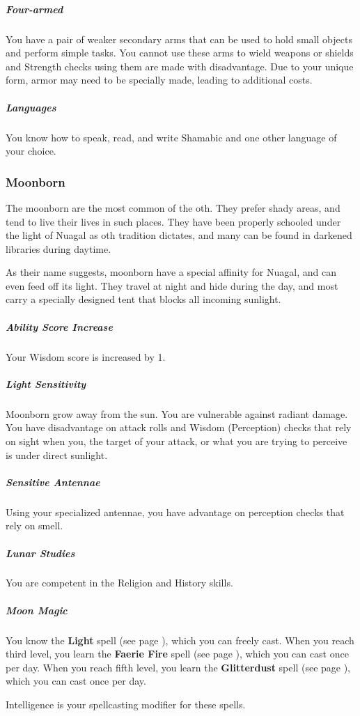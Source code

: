     \subparagraph{Four-armed} You have a pair of weaker secondary arms that can be used to hold small objects and perform simple tasks.
    You cannot use these arms to wield weapons or shields and Strength checks using them are made with disadvantage.
    Due to your unique form, armor may need to be specially made, leading to additional costs.

    \subparagraph{Languages} You know how to speak, read, and write Shamabic and one other language of your choice.

\subsubsection{Moonborn}
    The moonborn are the most common of the oth.
    They prefer shady areas, and tend to live their lives in such places.
    They have been properly schooled under the light of Nuagal as oth tradition dictates, and many can be found in darkened libraries during daytime.

    As their name suggests, moonborn have a special affinity for Nuagal, and can even feed off its light.
    They travel at night and hide during the day, and most carry a specially designed tent that blocks all incoming sunlight.

    \subparagraph{Ability Score Increase} Your Wisdom score is increased by 1.

    \subparagraph{Light Sensitivity} Moonborn grow away from the sun.
    You are vulnerable against radiant damage.
    You have disadvantage on attack rolls and Wisdom (Perception) checks that rely on sight when you, the target of your attack, or what you are trying to perceive is under direct sunlight.

    \subparagraph{Sensitive Antennae} Using your specialized antennae, you have advantage on perception checks that rely on smell.

    \subparagraph{Lunar Studies} You are competent in the Religion and History skills.

    \subparagraph{Moon Magic} You know the \textbf{Light} spell (see page \pageref{spell::light}), which you can freely cast.
    When you reach third level, you learn the \textbf{Faerie Fire} spell (see page \pageref{spell::faeriefire}), which you can cast once per day.
    When you reach fifth level, you learn the \textbf{Glitterdust} spell (see page \pageref{spell::glitterdust}), which you can cast once per day.

    Intelligence is your spellcasting modifier for these spells.

